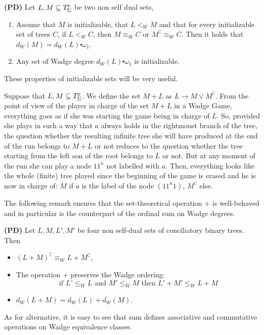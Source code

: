 \documentclass{llncs}
\begin{document}
\begin{Proposition}\label{p_2a}
{\bf (PD)}
Let $L, M\subseteq T^{\sf c}_\Sigma$ be two non self dual sets, 
\begin{enumerate}
\item Assume that $M$ is initializable, that $L <_W M $ and that for every initializable set of trees $C$, if $L<_WC$, then $M \equiv_W C$ or $M^\complement \equiv_W C$. Then it holds that  $d_W(M)=d_W(L)\centerdot \omega_1$.
\item Any set of Wadge degree $d_W(L)\centerdot \omega_1$ is initializable.
\end{enumerate}
\end{Proposition}
These properties of initializable sets will be very useful.

\vspace{0.2cm}
 \hspace{0.1cm}
Suppose that $L, M \subseteq T^{\sf c}_{\Sigma} $. We define the set $M+ L$ as $L \to M \lor M^\complement$. 
From the point of view of the player in charge of the set $M+ L$  in a Wadge Game, everything goes as if she was starting the game being in charge of $L$. So, provided she plays in such a way that $a$ always holds in the rightmoust branch of the tree, the question whether the resulting infinite tree she will have produced at the end of the run belongs to $M+ L$  or not reduces to the question whether the tree starting from  the left son of the root belongs to $L$ or not. But at any moment of the run she can play a node $11^n$ not labelled with $a$. Then, everything looks like the whole (finite) tree played since the beginning of the game is erased and he is now in charge of: $M$ if $a$ is the label of the node $(11^n1)$, $M^\complement$ else. 

The following remark ensures that the set-theoretical operation $+$ is well-behaved and in particular is the counterpart of the ordinal sum on Wadge degrees.
\begin{remark}{\bf (PD)}
\label{r_sum}
Let $L, M, L', M'$ be four non self-dual sets of conciliatory binary trees. Then

\begin{itemize}
\item  $ (L + M)^\complement \equiv_W  L+ M^\complement $,
\item The operation $+$ preserves the Wadge ordering: \[ \text{if } L' \leq_W L \text{ and } M' \leq_W M \text{ then } L'+ M' \leq_W L+ M
\]
\item $d_W(L+ M)= d_W(L) + d_W(M)$.
\end{itemize}
\end{remark}
\noindent As for alternative, it is easy to see that sum defines associative and commutative operations on Wadge equivalence classes. 
\end{document}
